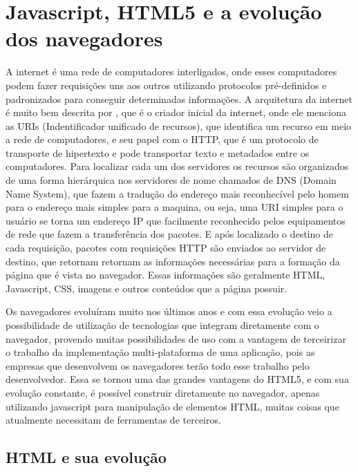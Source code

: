 \section{Javascript, HTML5 e a evolução dos navegadores}

A internet é uma rede de computadores interligados, onde esses
computadores podem fazer requisições uns aos outros utilizando protocolos pré-definidos e
padronizados para conseguir determinadas informações.
A arquitetura da internet é muito bem descrita por
, que é o criador inicial da
internet, onde ele menciona as URIs (Indentificador unificado de
recursos), que identifica um recurso em meio a rede de computadores, e
seu papel com o HTTP, que é um protocolo de transporte de hipertexto e
pode transportar texto e metadados entre os computadores.
Para localizar cada um dos servidores os recursos são organizados de
uma forma hierárquica nos servidores de nome chamados de DNS (Domain
Name System), que fazem a tradução do endereço mais reconhecível pelo
homem para o endereço mais simples para a maquina, ou seja, uma URI
simples para o usuário se torna um endereço IP que facilmente
reconhecido pelos equipamentos de rede que fazem a transferência dos
pacotes.
E após localizado o destino de cada requisição, pacotes com
requisições HTTP são enviados ao servidor de destino, que retornam
retornam as informações necessárias para a formação da página que é vista no
navegador. Essas informações são geralmente HTML, Javascript, CSS,
imagens e outros conteúdos que a página possuir.

Os navegadores evoluíram muito nos últimos anos e com essa evolução
veio a possibilidade de utilização de tecnologias que integram
diretamente com o navegador, provendo muitas possibilidades de uso com
a vantagem de terceirizar o trabalho da implementação multi-plataforma
de uma aplicação, pois as empresas que desenvolvem os navegadores
terão todo esse trabalho pelo desenvolvedor. Essa se tornou uma das
grandes vantagens do HTML5, e com sua evolução constante, é possível
construir diretamente no navegador, apenas utilizando javascript para
manipulação de elementos HTML, muitas coisas que atualmente necessitam
de ferramentas de terceiros.

\subsection{HTML e sua evolução}

